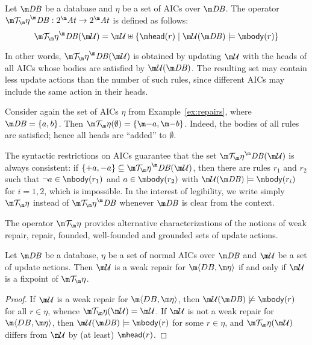 \begin{definition}
  Let $\db$ be a database and $\eta$ be a set of AICs over $\db$.
  The operator $\Op^\db:2^\atoms\to 2^\atoms$ is defined as follows:
  \[
    \Op^\db(\UU) = \UU\uplus\{\head(r)\mid \UU(\db)\models\body(r)\}
  \]
\end{definition}
In other words, $\Op^\db(\UU)$ is obtained by updating $\UU$ with the heads of all AICs whose bodies are satisfied by $\UU(\db)$.
The resulting set may contain less update actions than the number of such rules, since different AICs may include the same action in their heads.


\begin{example}
  Consider again the set of AICs $\eta$ from Example~\ref{ex:repairs}, where
  $\db=\{a,b\}$.
  Then $\Op(\emptyset)=\{\remove a, \remove b\}$. Indeed, the bodies of all rules are satisfied; hence all heads are ``added'' to $\emptyset$. 
\end{example}

The syntactic restrictions on AICs guarantee that the set $\Op^\db(\UU)$ is always consistent: if $\{+a,-a\}\subseteq\Op^\db(\UU)$, then there are rules $r_1$ and $r_2$ such that $\neg a\in\body(r_1)$ and $a\in\body(r_2)$ with $\UU(\db)\models\body(r_i)$ for $i=1,2$, which is impossible.
In the interest of legibility, we write simply $\Op$ instead of $\Op^\db$ whenever $\db$ is clear from the context.

The operator $\Op$ provides alternative characterizations of the notions of weak repair, repair, founded, well-founded and grounded sets of update actions.

\begin{lemma}
  \label{lem:weak-repair}
  Let $\db$ be a database, $\eta$ be a set of normal AICs over $\db$ and $\UU$ be a set of update actions.
  Then $\UU$ is a weak repair for $\fulldb$ if and only if $\UU$ is a fixpoint of $\Op$.
\end{lemma}
\begin{proof}
  If $\UU$ is a weak repair for $\fulldb$, then $\UU(\db)\not\models\body(r)$ for all $r\in\eta$, whence $\Op(\UU)=\UU$.
  If $\UU$ is not a weak repair for $\fulldb$, then $\UU(\db)\models\body(r)$ for some $r\in\eta$, and $\Op(\UU)$ differs from $\UU$ by (at least) $\head(r)$.
\end{proof}

